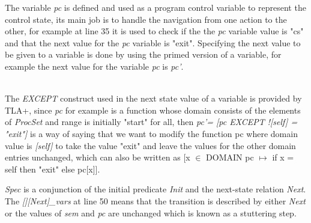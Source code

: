 \documentclass{thesul}
\begin{document}
The variable \textit{pc} is defined and used as a program control variable to represent the control state, its main job is to handle the navigation from one action to the other, for example at line 35 it is used to check if the the \textit{pc} variable value is "cs" and that the next value for the \textit{pc} variable is "exit". Specifying the next value to be given to a variable is done by using the primed version of a variable, for example the next value for the variable \textit{pc} is \textit{pc'}.

\hfill\\
The \textit{EXCEPT} construct used in the next state value of a variable is provided by TLA+, since \textit{pc} for example is a function whose domain consists of the elements of \textit{ProcSet} and range is initially "start" for all, then \textit{pc'= [pc EXCEPT ![self] = "exit"]} is a way of saying that we want to modify the function pc where domain value is \textit{[self]} to take the value "exit" and leave the values for the other domain entries unchanged, which can also be written as 
[x $\in$ DOMAIN pc $\longmapsto$ if x = self then "exit" else pc[x]].


\textit{Spec} is a conjunction of the initial predicate \textit{Init} and the next-state relation \textit{Next}. The \textit{[][Next]\_{vars}} at line 50 means that the transition is described by either \textit{Next} or the values of \textit{sem} and \textit{pc} are unchanged which is known as a stuttering step.
\end{document}
